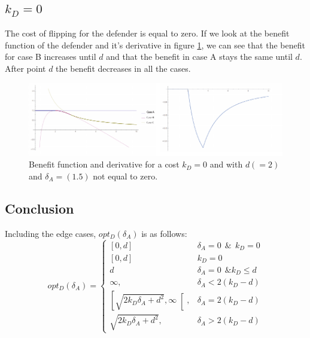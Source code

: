 \subsection*{$k_{D}=0$}
The cost of flipping for the defender is equal to zero. If we look at the benefit function of the defender and it's derivative in figure \ref{cost0}, we can see that the benefit for case B increases until $d$ and that the benefit in case A stays the same until $d$. After point $d$ the benefit decreases in all the cases. 

\begin{figure}[hbtp]
\centering
\includegraphics[scale=1]{Images/cost0.pdf} 
\caption{Benefit function and derivative for a cost $k_{D} = 0$ and with $d (=2)$ and $\delta_{A}=(1.5)$ not equal to zero.}
\label{cost0}
\end{figure}




\subsection{Conclusion}
Including the edge cases, $opt_{D}(\delta_{A})$ is as follows:  \\

 \begin{displaymath}
  opt_{D}(\delta_{A}) = \left\{
     \begin{array}{lr}
     \left[0,d\right] & \delta_{A} =0 ~~\& ~~k_{D}=0 \\
     \left[0,d\right] & k_{D}=0\\
     d & \delta_{A} =0 ~~ \& k_{D} \leq d\\
          \infty , & \delta_{A} < 2(k_{D} - d)\\
      \left[ \sqrt{2k_{D}\delta_{A} + d^{2}},\infty\right[ , & \delta_{A} = 2(k_{D} - d) \\
      \sqrt{2k_{D}\delta_{A} + d^{2}}, & \delta_{A} > 2(k_{D} - d)
     \end{array}
   \right.
\end{displaymath}
%
%
